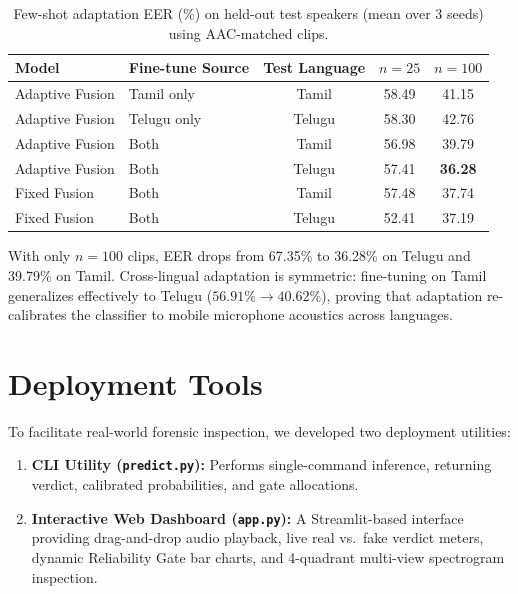 \documentclass[conference]{IEEEtran}
\begin{document}
\begin{table}[t]
\caption{Few-shot adaptation EER (\%) on held-out test speakers (mean over 3 seeds) using AAC-matched clips.}
\label{tab:fewshot}
\centering
\footnotesize
\setlength{\tabcolsep}{5pt}
\begin{tabular}{llccc}
\toprule
Model & Fine-tune Source & Test Language & $n=25$ & $n=100$ \\
\midrule
Adaptive Fusion & Tamil only   & Tamil  & 58.49 & 41.15 \\
Adaptive Fusion & Telugu only  & Telugu & 58.30 & 42.76 \\
Adaptive Fusion & Both         & Tamil  & 56.98 & 39.79 \\
Adaptive Fusion & Both         & Telugu & 57.41 & \textbf{36.28} \\
\midrule
Fixed Fusion    & Both         & Tamil  & 57.48 & 37.74 \\
Fixed Fusion    & Both         & Telugu & 52.41 & 37.19 \\
\bottomrule
\end{tabular}
\end{table}

With only $n=100$ clips, EER drops from 67.35\% to 36.28\% on Telugu and 39.79\% on Tamil. Cross-lingual adaptation is symmetric: fine-tuning on Tamil generalizes effectively to Telugu ($56.91\% \to 40.62\%$), proving that adaptation re-calibrates the classifier to mobile microphone acoustics across languages.

\section{Deployment Tools}
To facilitate real-world forensic inspection, we developed two deployment utilities:
\begin{enumerate}
    \item \textbf{CLI Utility (\texttt{predict.py}):} Performs single-command inference, returning verdict, calibrated probabilities, and gate allocations.
    \item \textbf{Interactive Web Dashboard (\texttt{app.py}):} A Streamlit-based interface providing drag-and-drop audio playback, live real vs.\ fake verdict meters, dynamic Reliability Gate bar charts, and 4-quadrant multi-view spectrogram inspection.
\end{enumerate}

\end{document}

